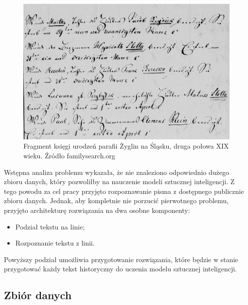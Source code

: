 \begin{figure}[h!]
    \centering
  \includegraphics[width=1\textwidth]{2.png}
    \caption{Fragment księgi urodzeń parafii Żyglin na Śląsku, druga połowa XIX wieku.
Źródło familysearch.org}
\label{fig:old}
\end{figure}

Wstępna analiza problemu wykazała, że nie znaleziono odpowiednio dużego zbioru danych, który pozwoliłby na nauczenie modeli sztucznej inteligencji. Z tego powodu za cel pracy przyjęto rozpoznawanie pisma z dostępnego publicznie zbioru danych. Jednak, aby kompletnie nie porzucić pierwotnego problemu, przyjęto architekturę rozwiązania na dwa osobne komponenty:
\begin{itemize}
  \item Podział tekstu na linie;
  \item Rozpoznanie tekstu z linii.
\end{itemize}
Powyższy podział umożliwia przygotowanie rozwiązania, które będzie w stanie przygotować każdy tekst historyczny do uczenia modelu sztucznej inteligencji. 


\subsection{Zbiór danych}

